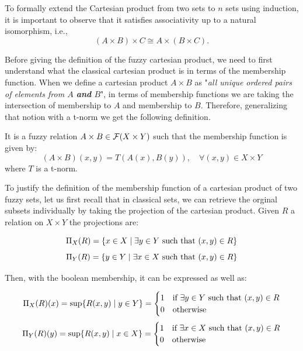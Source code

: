 \begin{remark}
  To formally extend the Cartesian product from two sets to \( n \) sets using induction, it is important to observe that it satisfies associativity up to a natural isomorphism, i.e., 
  \[
  (A\times B)\times C \cong A\times (B\times C).
  \]
\end{remark}

Before giving the definition of the fuzzy cartesian product, we need to first understand what the classical cartesian product is in terms of the membership function. When we define a cartesian product $A\times B$ as "\textit{all unique ordered pairs of elements from $A$ \textbf{and} $B$}", in terms of membership functions we are taking the intersection of membership to $A$ and membership to $B$. Therefore, generalizing that notion with a t-norm we get the following definition.

\begin{definition}
  It is a fuzzy relation $A\times B \in \mathcal{F}(X\times Y)$ such that the membership function is given by:
  \[ 
  (A\times B)(x,y) = T(A(x), B(y)), \quad \forall (x,y) \in X\times Y
  \]
  where $T$ is a t-norm.
\end{definition}

To justify the definition of the membership function of a cartesian product of two fuzzy sets, let us first recall that in classical sets, we can retrieve the orginal subsets individually by taking the projection of the cartesian product. Given $R$ a relation on $X\times Y$ the projections are:

\[\Pi_X(R)=\{x \in X \mid \exists y \in Y \textnormal{ such that } (x,y) \in R\}\]
\[\Pi_Y(R)=\{y \in Y \mid \exists x \in X \textnormal{ such that } (x,y) \in R\}\]

Then, with the boolean membership, it can be expressed as well as:

\[\Pi_X(R)(x)=\sup\{R(x,y) \mid y\in Y\}=
\begin{cases}
  1 & \textnormal{if } \exists y \in Y \textnormal{ such that } (x,y) \in R \\
  0 & \textnormal{otherwise}
\end{cases}
\]
\[
  \Pi_Y(R)(y)=\sup\{R(x,y) \mid x\in X\}=
  \begin{cases}
    1 & \textnormal{if } \exists x \in X \textnormal{ such that } (x,y) \in R \\
    0 & \textnormal{otherwise}
  \end{cases}
\]

